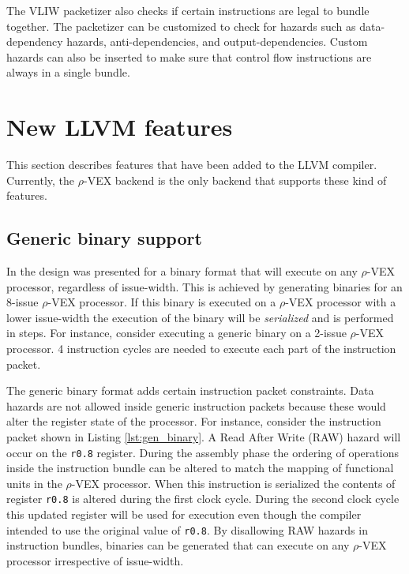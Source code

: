 The VLIW packetizer also checks if certain instructions are legal to bundle together. The packetizer can be customized to check for hazards such as data-dependency hazards, anti-dependencies, and output-dependencies. Custom hazards can also be inserted to make sure that control flow instructions are always in a single bundle.

\section{New LLVM features}
This section describes features that have been added to the LLVM compiler. Currently, the $\rho$-VEX backend is the only backend that supports these kind of features.

\subsection{Generic binary support}

In \cite{Anthony-Brandon:2013jk} the design was presented for a binary format that will execute on any $\rho$-VEX processor, regardless of issue-width. This is achieved by generating binaries for an 8-issue $\rho$-VEX processor. If this binary is executed on a $\rho$-VEX processor with a lower issue-width the execution of the binary will be \emph{serialized} and is performed in steps. For instance, consider executing a generic binary on a 2-issue $\rho$-VEX processor. 4 instruction cycles are needed to execute each part of the instruction packet.


The generic binary format adds certain instruction packet constraints. Data hazards are not allowed inside generic instruction packets because these would alter the register state of the processor. For instance, consider the instruction packet shown in Listing \ref{lst:gen_binary}. A Read After Write (RAW) hazard will occur on the \texttt{r0.8} register. During the assembly phase the ordering of operations inside the instruction bundle can be altered to match the mapping of functional units in the $\rho$-VEX processor. When this instruction is serialized the contents of register \texttt{r0.8} is altered during the first clock cycle. During the second clock cycle this updated register will be used for execution even though the compiler intended to use the original value of \texttt{r0.8}. By disallowing RAW hazards in instruction bundles, binaries can be generated that can execute on any $\rho$-VEX processor irrespective of issue-width.

